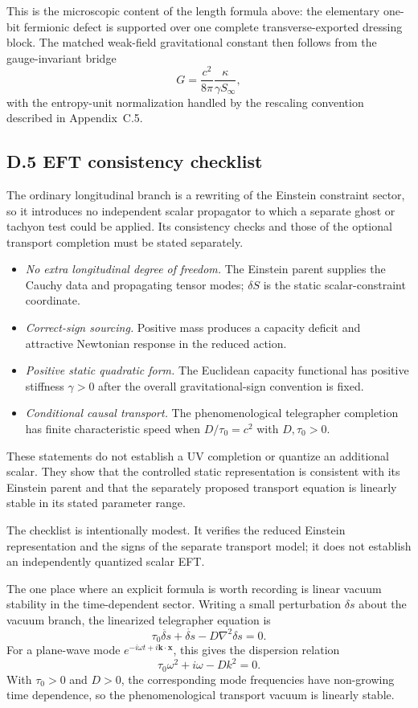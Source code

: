 \documentclass[11pt]{article}
\begin{document}
This is the microscopic content of the length formula above: the elementary one-bit fermionic defect is supported over one complete transverse-exported dressing block. The matched weak-field gravitational constant then follows from the gauge-invariant bridge
\[
G=\frac{c^2}{8\pi}\frac{\kappa}{\gamma S_\infty},
\]
with the entropy-unit normalization handled by the rescaling convention described in Appendix~C.5.

\subsection*{D.5 EFT consistency checklist}

The ordinary longitudinal branch is a rewriting of the Einstein constraint sector, so it introduces no independent scalar propagator to which a separate ghost or tachyon test could be applied. Its consistency checks and those of the optional transport completion must be stated separately.
\begin{itemize}
\item \emph{No extra longitudinal degree of freedom.} The Einstein parent supplies the Cauchy data and propagating tensor modes; $\delta S$ is the static scalar-constraint coordinate.
\item \emph{Correct-sign sourcing.} Positive mass produces a capacity deficit and attractive Newtonian response in the reduced action.
\item \emph{Positive static quadratic form.} The Euclidean capacity functional has positive stiffness $\gamma>0$ after the overall gravitational-sign convention is fixed.
\item \emph{Conditional causal transport.} The phenomenological telegrapher completion has finite characteristic speed when $D/\tau_0=c^2$ with $D,\tau_0>0$.
\end{itemize}
These statements do not establish a UV completion or quantize an additional scalar. They show that the controlled static representation is consistent with its Einstein parent and that the separately proposed transport equation is linearly stable in its stated parameter range.

The checklist is intentionally modest. It verifies the reduced Einstein representation and the signs of the separate transport model; it does not establish an independently quantized scalar EFT.

The one place where an explicit formula is worth recording is linear vacuum stability in the time-dependent sector. Writing a small perturbation $\delta s$ about the vacuum branch, the linearized telegrapher equation is
\[
\tau_0\ddot{\delta s}+\dot{\delta s}-D\nabla^2\delta s=0.
\]
For a plane-wave mode $e^{-i\omega t+i\mathbf{k}\cdot\mathbf{x}}$, this gives the dispersion relation
\[
\tau_0\omega^2+i\omega-Dk^2=0.
\]
With $\tau_0>0$ and $D>0$, the corresponding mode frequencies have non-growing time dependence, so the phenomenological transport vacuum is linearly stable.
\end{document}
